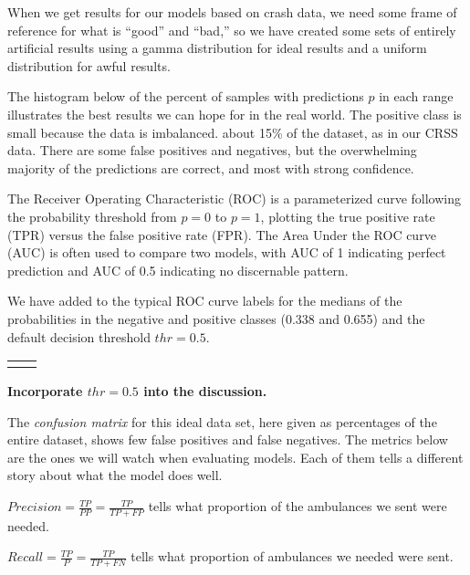When we get results for our models based on crash data, we need some frame of reference for what is ``good'' and ``bad,'' so we have created some sets of entirely artificial results using a gamma distribution for ideal results and a uniform distribution for awful results.  

The histogram below of the percent of samples with predictions $p$ in each range illustrates the best results we can hope for in the real world.  The positive class is small because the data is imbalanced. about 15\% of the dataset, as in our CRSS data.  There are some false positives and negatives, but the overwhelming majority of the predictions are correct, and most with strong confidence.  

The Receiver Operating Characteristic (ROC) is a parameterized curve following the probability threshold from $p=0$ to $p=1$, plotting the true positive rate (TPR) versus the false positive rate (FPR).  The Area Under the ROC curve (AUC) is often used to compare two models, with AUC of 1 indicating perfect prediction and AUC of 0.5 indicating no discernable pattern.  

We have added to the typical ROC curve labels for the medians of the probabilities in the negative and positive classes (0.338 and 0.655) and the default decision threshold $thr = 0.5$.

\begin{tabular}{p{} p{}}
  \vspace{0pt} 
  &
  \vspace{0pt} 
\end{tabular}

{\bf Incorporate $thr=0.5$ into the discussion.}

The {\it confusion matrix} for this ideal data set, here given as percentages of the entire dataset, shows few false positives and false negatives.  The metrics below are the ones we will watch when evaluating models.  Each of them tells a different story about what the model does well.

\vskip 6pt

$\displaystyle Precision = \frac{TP}{PP} = \frac{TP}{TP+FP}$ tells what proportion of the ambulances we sent were needed.  

\vskip 6pt

$\displaystyle Recall = \frac{TP}{P} = \frac{TP}{TP + FN}$ tells what proportion of ambulances we needed were sent.

